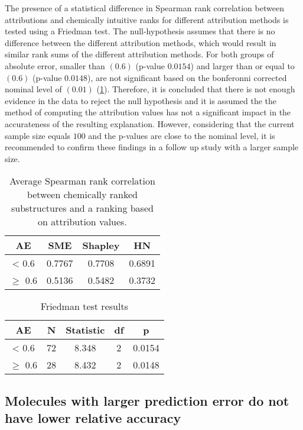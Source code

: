 The presence of a statistical difference in Spearman rank correlation
between attributions and chemically intuitive ranks for different
attribution methods is tested using a Friedman test. The null-hypothesis
assumes that there is no difference between the different attribution
methods, which would result in similar rank sums of the different
attribution methods. For both groups of absolute error, smaller than
$(0.6)$ (p-value $0.0154$) and larger than or equal to $(0.6)$ (p-value
$0.0148$), are not significant based on the bonferonni corrected nominal
level of $(0.01)$ (\cref{fig:friedman_results}). Therefore, it is concluded that there is not enough
evidence in the data to reject the null hypothesis and it is assumed the
the method of computing the attribution values has not a significant
impact in the accurateness of the resulting explanation. However, considering 
that the current sample size equals $100$ and the p-values are close to the 
nominal level, it is recommended to confirm these findings in a follow up 
study with a larger sample size.


\begin{table}[h]
    \centering
    \caption{Average Spearman rank correlation between chemically ranked substructures and 
    a ranking based on attribution values.}
    \begin{tabular}{cccc}
    \toprule
    AE & SME & Shapley & HN \\
    \midrule
     < 0.6 & 0.7767 & 0.7708 & 0.6891 \\
    $\ge$ 0.6 & 0.5136 & 0.5482 & 0.3732 \\
     \bottomrule
    \end{tabular}
\end{table}


\begin{table}[h]
    \centering
    \caption{Friedman test results}
    \label{fig:friedman_results}
    \begin{tabular}{ccccc}
    \toprule
    AE & N & Statistic & df & p \\
    \midrule
     < 0.6 & 72 & 8.348 & 2 & 0.0154  \\
    $\ge$ 0.6 & 28 & 8.432 & 2 & 0.0148 \\
     \bottomrule
    \end{tabular}
\end{table}


\subsection{Molecules with larger prediction error do not have lower relative accuracy}


